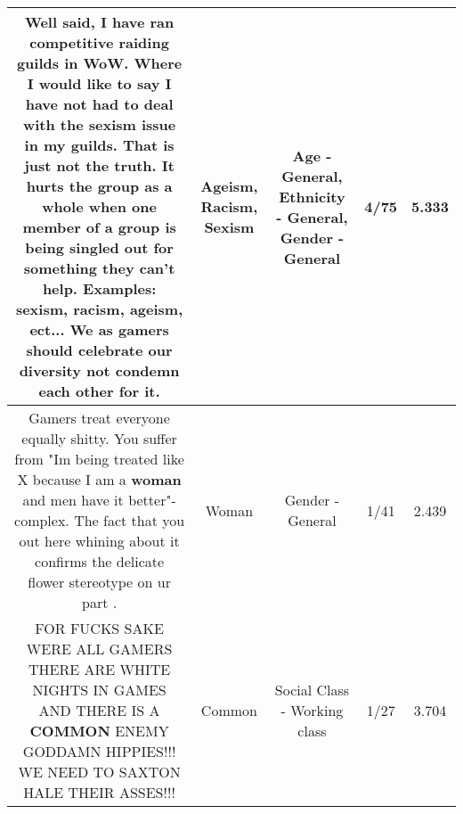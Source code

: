 \documentclass[11pt]{article}
\newlength\mylength
\begin{document}
\begin{center}
\begin{longtable}{|C{.65\mylength}|C{.30\mylength}|C{.12\mylength}|C{.12\mylength}|C{.12\mylength}|}
  \small Well said, I have ran competitive raiding guilds in WoW. Where I would like to say I have not had to deal with the \textbf{sexism} issue in my guilds. That is just not the truth. It hurts the group as a whole when one member of a group is being singled out for something they can't help. Examples: \textbf{sexism}, \textbf{racism}, \textbf{ageism}, ect... We as gamers should celebrate our diversity not condemn each other for it.\normalsize   & Ageism, Racism, Sexism & Age - General, Ethnicity - General, Gender - General & 4/75 & 5.333 \\  \hline
  \small Gamers treat everyone equally shitty. You suffer from "Im being treated like X because I am a \textbf{woman} and men have it better"-complex. The fact that you out here whining about it confirms the delicate flower stereotype on ur part .\normalsize   & Woman & Gender - General & 1/41 & 2.439 \\  \hline
  \small FOR FUCKS SAKE WERE ALL GAMERS THERE ARE WHITE NIGHTS IN GAMES AND THERE IS A \textbf{COMMON} ENEMY GODDAMN HIPPIES!!! WE NEED TO SAXTON HALE THEIR ASSES!!!\normalsize   & Common & Social Class - Working class & 1/27 & 3.704 \\  \hline

\end{longtable}
\end{center}
\end{document}
